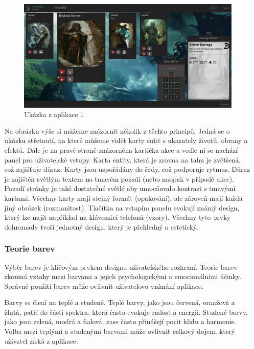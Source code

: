 \begin{figure}[H]
  \centering
  \includegraphics[width=\textwidth]{resources/figures/example1.png}
  \caption{Ukázka z aplikace 1}
  \label{fig:example1}
\end{figure}

Na obrázku výše si můžeme znázornit několik z těchto principů. Jedná se o ukázku střetnutí, na které můžeme vidět karty entit s ukazately životů, obrany a efektů. Dále je na pravé straně znázorněna kartička akce a vedle ní se nachází panel pro uživatelské vstupy. Karta entity, která je zrovna na tahu je zvětšená, což zajišťuje důraz. Karty jsou uspořádány do řady, což podporuje rytmus. Důraz je zajištěn světlým textem na tmavém pozadí (nebo naopak v případě akce). Pozadí stránky je také dostatečné světlé aby umocňovalo kontrast s tmavými kartami. Všechny karty mají stejný formát (opakování), ale zároveň mají každá jiný obrázek (rozmanitost). Tlačítka na vstupím panelu evokují známý design, který lze najít například na klávesnici telefonů (vzory). Všechny tyto prvky dohromady tvoří jednotný design, který je přehledný a estetický.

\subsubsection{Teorie barev}
Výběr barev je klíčovým prvkem designu uživatelského rozhraní. Teorie barev zkoumá vztahy mezi barvami a jejich psychologickými a emocionálními účinky. Správné použití barev může ovlivnit uživatelovo vnímání aplikace.

Barvy se člení na teplé a studené. Teplé barvy, jako jsou červená, oranžová a žlutá, patří do části spektra, která často evokuje radost a energii. Studené barvy, jako jsou zelená, modrá a fialová, zase často přinášejí pocit klidu a harmonie. Volba mezi teplými a studenými barvami může ovlivnit celkový dojem, který uživatel získá z aplikace.

